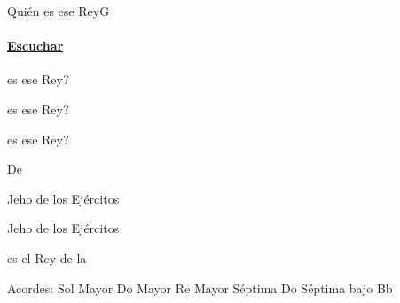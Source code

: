 \documentclass[12pt, spanish]{book}
\begin{document}
    \begin{song}{Quién es ese Rey}{G}
        {} %
        {}
        {} %
        {}

        \ifChordBk
        \paragraph{\mbox{}\hfill\protect\href{https://open.spotify.com/intl-es/track/7DQoq6qnbYXVx6bzWuuUs6}{Escuchar}\mbox{}\hfill}
        \fi

        \begin{SBOpGroup}
             es ese Rey?

             es ese Rey?

             es ese Rey?

            De 
        \end{SBOpGroup}

        \begin{SBChorus}
            Jeho de los Ejércitos

            Jeho de los Ejércitos

             es el Rey de la 
        \end{SBChorus}

        \ifChordBk
        \begin{SBOpGroup}
            Acordes:
            \upchord{\G}\qquad Sol Mayor \hfill
            \upchord{\C}\qquad Do Mayor \hfill\null\break
            \upchord{\Dseven}\qquad Re Mayor S\'eptima \hfill
            \upchord{\CsevenBflat}\qquad Do S\'eptima bajo Bb \hfill\null\break
        \end{SBOpGroup}
        \fi
    \end{song}
\end{document}
